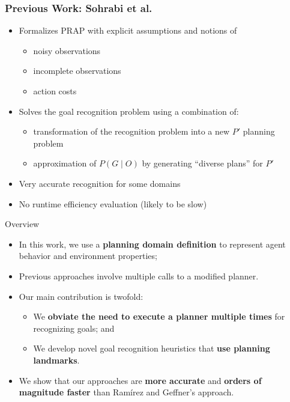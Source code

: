 \documentclass{beamer}
\begin{document}
	\begin{frame}[c]\frametitle{Previous Work: Sohrabi et al.}
		\begin{itemize}
			\item Formalizes PRAP with explicit assumptions and notions of 
			\begin{itemize}
				\item noisy observations
				\item incomplete observations
				\item action costs
			\end{itemize}
			\item Solves the goal recognition problem using a combination of:
			\begin{itemize}
				\item transformation of the recognition problem into a new $P'$ planning problem
				\item approximation of $P(G \mid O)$ by generating ``diverse plans'' for $P'$
			\end{itemize}
			\item Very accurate recognition for some domains
			\item No runtime efficiency evaluation (likely to be slow)
		\end{itemize}
	\end{frame}
\fi
	
    \begin{frame}{Overview}
       	\begin{itemize}
			\item In this work, we use a \textbf{planning domain definition} to represent agent behavior and environment properties;
			\item Previous approaches involve multiple calls to a modified planner.
			\item Our main contribution is twofold:
				\begin{itemize}
					\item We \textbf{obviate the need to execute a planner multiple times} for recognizing goals; and
					\item We develop novel goal recognition heuristics that \textbf{use planning landmarks}.
				 \end{itemize}
			\item We show that our approaches are \textbf{more accurate} and \textbf{orders of magnitude faster} than Ramírez and Geffner's approach.
		\end{itemize}
    \end{frame}
\end{document}
